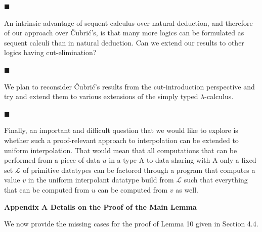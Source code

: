 \documentclass[10pt,a4paper]{article}
\begin{document}
 
 
\par\noindent  $\blacksquare$ 
 
An intrinsic advantage of sequent calculus over natural deduction, and therefore of our approach over Čubrić’s, is that many more logics can be formulated as sequent calculi than in natural deduction. Can we extend our results to other logics having cut-elimination?\par
 
 
 
\par\noindent  $\blacksquare$ 
 
We plan to reconsider Čubrić’s results from the cut-introduction perspective and try and extend them to various extensions of the simply typed $\lambda$-calculus.\par
 
 
 
\par\noindent  $\blacksquare$ 
 
Finally, an important and difficult question that we would like to explore is whether such a proof-relevant approach to interpolation can be extended to uniform interpolation. That would mean that all computations that can be performed from a piece of data $u$ in a type A to data sharing with A only a fixed set $\mathcal{L}$ of primitive datatypes can be factored through a program that computes a value $v$ in the uniform interpolant datatype build from $\mathcal{L}$ such that everything that can be computed from $u$ can be computed from $v$ as well.\par
 
 
  
 



 
\par\medskip\noindent\textbf{Appendix A  Details on the Proof of the Main Lemma}\par
 
 
We now provide the missing cases for the proof of Lemma 10 given in Section 4.4.\par
 
 
 
\end{document}
